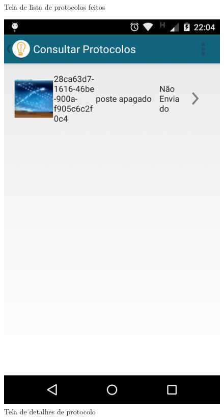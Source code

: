 \documentclass[
	article,			%
	11pt,				%
	oneside,			%
	a4paper,			%
	english,			%
	brazil,				%
	sumario=tradicional
	]{abntex2}
\begin{document}
\begin{figure}[!htbp]
 \centering
  \begin{minipage}{0.4\textwidth}
    \centering
    \caption{\label{android-tela-lista-chamadas}Tela de lista de protocolos feitos}
    \includegraphics[scale=0.1]{android/7.png}
  \end{minipage}
  \hfill
  \begin{minipage}{0.4\textwidth}
    \centering
    \caption{\label{android-tela-detalhes-chamada}Tela de detalhes de protocolo}

\end{minipage}
\end{figure}
\end{document}
